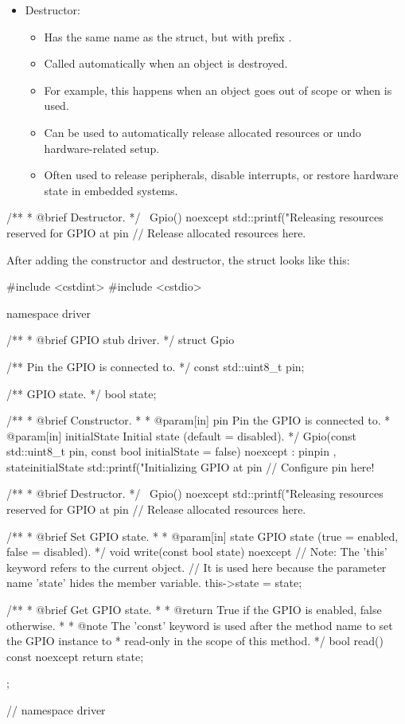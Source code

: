 \begin{itemize}
  \item Destructor:
  \begin{itemize}
    \item Has the same name as the struct, but with prefix \code{~}.
    \item Called automatically when an object is destroyed.
    \item For example, this happens when an object goes out of scope or when  is used.
    \item Can be used to automatically release allocated resources or undo hardware-related setup.
    \item Often used to release peripherals, disable interrupts, or restore hardware state in
      embedded systems.
  \end{itemize}
\end{itemize}

\begin{cppcode}
/**
 * @brief Destructor.
 */
~Gpio() noexcept
{
    std::printf("Releasing resources reserved for GPIO at pin %
    // Release allocated resources here.
}
\end{cppcode}

\noindent After adding the constructor and destructor, the struct  looks like
this:

\begin{cppcode}
#include <cstdint>
#include <cstdio>

namespace driver
{
/**
 * @brief GPIO stub driver.
 */
struct Gpio
{
    /** Pin the GPIO is connected to. */
    const std::uint8_t pin;

    /** GPIO state. */
    bool state;

    /**
     * @brief Constructor.
     *
     * @param[in] pin Pin the GPIO is connected to.
     * @param[in] initialState Initial state (default = disabled).
     */
    Gpio(const std::uint8_t pin, const bool initialState = false) noexcept
        : pin{pin}
        , state{initialState}
    {
        std::printf("Initializing GPIO at pin %
        // Configure pin here!
    }

    /**
     * @brief Destructor.
     */
    ~Gpio() noexcept
    {
        std::printf("Releasing resources reserved for GPIO at pin %
        // Release allocated resources here.
    }

    /**
     * @brief Set GPIO state.
     *
     * @param[in] state GPIO state (true = enabled, false = disabled).
     */
    void write(const bool state) noexcept
    {
        // Note: The 'this' keyword refers to the current object.
        // It is used here because the parameter name 'state' hides the member variable.
        this->state = state;
    }

    /**
     * @brief Get GPIO state.
     *
     * @return True if the GPIO is enabled, false otherwise.
     *
     * @note The 'const' keyword is used after the method name to set the GPIO instance to
     *       read-only in the scope of this method.
     */
    bool read() const noexcept { return state; }
};
} // namespace driver
\end{cppcode}

